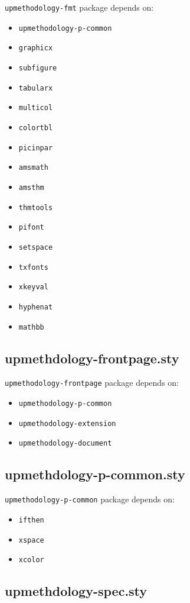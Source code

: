 \documentclass[book]{upmethodology-document}
\begin{document}
\texttt{upmethodology-fmt} package depends on:
\begin{itemize}
\item \texttt{upmethodology-p-common}
\item \texttt{graphicx}
\item \texttt{subfigure}
\item \texttt{tabularx}
\item \texttt{multicol}
\item \texttt{colortbl}
\item \texttt{picinpar}
\item \texttt{amsmath}
\item \texttt{amsthm}
\item \texttt{thmtools}
\item \texttt{pifont}
\item \texttt{setspace}
\item \texttt{txfonts}
\item \texttt{xkeyval}
\item \texttt{hyphenat}
\item \texttt{mathbb}
\end{itemize}

\subsection{upmethdology-frontpage.sty}

\texttt{upmethodology-frontpage} package depends on:
\begin{itemize}
\item \texttt{upmethodology-p-common}
\item \texttt{upmethodology-extension}
\item \texttt{upmethodology-document}
\end{itemize}

\subsection{upmethdology-p-common.sty}

\texttt{upmethodology-p-common} package depends on:
\begin{itemize}
\item \texttt{ifthen}
\item \texttt{xspace}
\item \texttt{xcolor}
\end{itemize}

\subsection{upmethdology-spec.sty}
\end{document}

